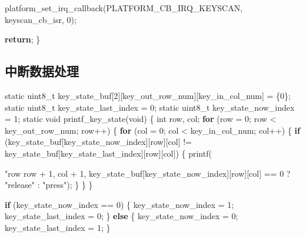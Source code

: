 \documentclass[
  12pt,
]{book}
\newenvironment{Shaded}{\begin{snugshade}}{\end{snugshade}}
\newcommand{\ControlFlowTok}[1]{\textcolor[rgb]{0.13,0.29,0.53}{\textbf{#1}}}
\newcommand{\DataTypeTok}[1]{\textcolor[rgb]{0.13,0.29,0.53}{#1}}
\newcommand{\DecValTok}[1]{\textcolor[rgb]{0.00,0.00,0.81}{#1}}
\newcommand{\NormalTok}[1]{#1}
\newcommand{\SpecialCharTok}[1]{\textcolor[rgb]{0.00,0.00,0.00}{#1}}
\newcommand{\StringTok}[1]{\textcolor[rgb]{0.31,0.60,0.02}{#1}}
\begin{document}
\begin{Shaded}
\begin{Highlighting}[]
\NormalTok{    platform_set_irq_callback(PLATFORM_CB_IRQ_KEYSCAN, keyscan_cb_isr, }\DecValTok{0}\NormalTok{);}

    \ControlFlowTok{return}\NormalTok{;}
\NormalTok{\}}
\end{Highlighting}
\end{Shaded}

\hypertarget{ux4e2dux65adux6570ux636eux5904ux7406}{%
\subsection{中断数据处理}\label{ux4e2dux65adux6570ux636eux5904ux7406}}

\begin{Shaded}
\begin{Highlighting}[]
\DataTypeTok{static} \DataTypeTok{uint8_t}\NormalTok{ key_state_buf[}\DecValTok{2}\NormalTok{][key_out_row_num][key_in_col_num] = \{}\DecValTok{0}\NormalTok{\};}
\DataTypeTok{static} \DataTypeTok{uint8_t}\NormalTok{ key_state_last_index = }\DecValTok{0}\NormalTok{;}
\DataTypeTok{static} \DataTypeTok{uint8_t}\NormalTok{ key_state_now_index = }\DecValTok{1}\NormalTok{;}
\DataTypeTok{static} \DataTypeTok{void}\NormalTok{ printf_key_state(}\DataTypeTok{void}\NormalTok{)}
\NormalTok{\{}
    \DataTypeTok{int}\NormalTok{ row, col;}
    \ControlFlowTok{for}\NormalTok{ (row = }\DecValTok{0}\NormalTok{; row < key_out_row_num; row++) \{}
        \ControlFlowTok{for}\NormalTok{ (col = }\DecValTok{0}\NormalTok{; col < key_in_col_num; col++) \{}
            \ControlFlowTok{if}\NormalTok{ (key_state_buf[key_state_now_index][row][col] !=}
\NormalTok{                key_state_buf[key_state_last_index][row][col]) \{}
\NormalTok{                printf(}\StringTok{"row%
\NormalTok{                row + }\DecValTok{1}\NormalTok{, col + }\DecValTok{1}\NormalTok{,}
\NormalTok{                key_state_buf[key_state_now_index][row][col] == }\DecValTok{0}\NormalTok{ ?}
                \StringTok{"release"}\NormalTok{ : }\StringTok{"press"}\NormalTok{);}
\NormalTok{            \}}
\NormalTok{        \}}
\NormalTok{    \}}

    \ControlFlowTok{if}\NormalTok{ (key_state_now_index == }\DecValTok{0}\NormalTok{) \{}
\NormalTok{        key_state_now_index = }\DecValTok{1}\NormalTok{;}
\NormalTok{        key_state_last_index = }\DecValTok{0}\NormalTok{;}
\NormalTok{    \} }\ControlFlowTok{else}\NormalTok{ \{}
\NormalTok{        key_state_now_index = }\DecValTok{0}\NormalTok{;}
\NormalTok{        key_state_last_index = }\DecValTok{1}\NormalTok{;}
\NormalTok{    \}}

}
\end{Highlighting}
\end{Shaded}
\end{document}
